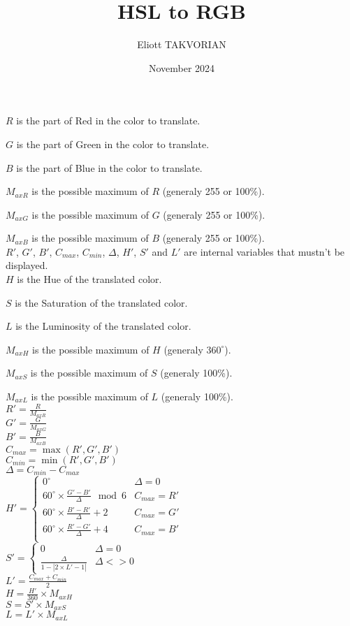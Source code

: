 \documentclass{article}
\title{HSL to RGB}
\author{Eliott TAKVORIAN}
\date{November 2024}
\begin{document}
    $R$ is the part of Red in the color to translate.

    $G$ is the part of Green in the color to translate.

    $B$ is the part of Blue in the color to translate.

    $M_{axR}$ is the possible maximum of $R$ (generaly 255 or 100\%).

    $M_{axG}$ is the possible maximum of $G$ (generaly 255 or 100\%).

    $M_{axB}$ is the possible maximum of $B$ (generaly 255 or 100\%).\\

    $R'$, $G'$, $B'$, $C_{max}$, $C_{min}$, $\Delta$, $H'$, $S'$ and $L'$ are internal variables that mustn't be displayed.\\

    $H$ is the Hue of the translated color.
    
    $S$ is the Saturation of the translated color.
    
    $L$ is the Luminosity of the translated color.
    
    $M_{axH}$ is the possible maximum of $H$ (generaly $360^\circ$).

    $M_{axS}$ is the possible maximum of $S$ (generaly 100\%).

    $M_{axL}$ is the possible maximum of $L$ (generaly 100\%).\\
    
    $R'=\frac{R}{M_{axR}}$\\
    
    $G'=\frac{G}{M_{axG}}$\\
    
    $B'=\frac{B}{M_{axB}}$\\

    $C_{max}=\max({R'}, {G'}, {B'})$\\

    $C_{min}=\min({R'}, {G'}, {B'})$\\

    $\Delta=C_{min}-C_{max}$\\

    $H'=
    \begin{cases}
        0^\circ & \Delta=0\\
        60^\circ \times \frac{G'-B'}{\Delta} \mod 6 & C_{max}=R'\\
        60^\circ \times \frac{B'-R'}{\Delta}+2 & C_{max}=G'\\
        60^\circ \times \frac{R'-G'}{\Delta}+4 & C_{max}=B'\\
    \end{cases}$\\

    $S'=
    \begin{cases}
        0 & \Delta=0\\
        \frac{\Delta}{1-|2\times L'-1|} & \Delta <> 0
    \end{cases}$\\

    $L' = \frac{C_{max}+C_{min}}{2}$\\

    $H=\frac{H'}{360}\times M_{axH}$\\

    $S=S'\times M_{axS}$\\

    $L=L'\times M_{axL}$
\end{document}
